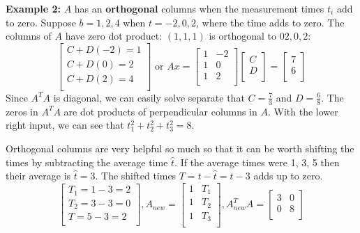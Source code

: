 \textbf{Example 2:} \(A\) has an \textbf{orthogonal} columns when the measurement times \(t_i\) add to zero. Suppose \(b = 1, 2, 4\) when \(t = -2, 0, 2\), where the time adds to zero. The columns of \(A\) have zero dot product: \((1, 1, 1)\) is orthogonal to \(02, 0, 2\):
\[
    \begin{bmatrix}
         C + D(-2) = 1\\
         C + D(0) = 2\\
         C + D(2) = 4\\
    \end{bmatrix}
    \text{ or }
    Ax = 
    \begin{bmatrix}
        1 & -2  \\
        1 & 0  \\
        1 & 2  \\
    \end{bmatrix}
    \begin{bmatrix}
         C \\
         D \\
    \end{bmatrix}
    = 
    \begin{bmatrix}
         7 \\
         6 \\
    \end{bmatrix}
\]       
Since \(A^T A\) is diagonal, we can easily solve separate that \(C = \frac{7}{3}\) and \(D = \frac{6}{8}\). The zeros in \(A^T A\) are dot products of perpendicular columns in \(A\). With the lower right input, we can see that \(t^2_1 + t^2_2 + t^2_3 = 8\). 

Orthogonal columns are very helpful so much so that it can be worth shifting the times by subtracting the average time \(\hat{t}\). If the average times were 1, 3, 5 then their average is \(\hat{t} = 3\). The shifted times \(T = t - \hat{t} = t - 3\) adds up to zero. 
\[
    \begin{bmatrix}
         T_1 = 1 - 3 = 2 \\
         T_2 = 3 - 3 = 0 \\
         T = 5 - 3 = 2 \\
    \end{bmatrix}
    , 
    A_{new} = 
    \begin{bmatrix}
        1 & T_1  \\
        1 & T_2  \\
        1 & T_3  \\
    \end{bmatrix} 
    , 
    A^T_{new} A = 
    \begin{bmatrix}
        3 &  0 \\
        0 &  8 \\
    \end{bmatrix} 
\]   

